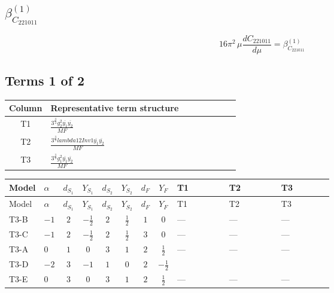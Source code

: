 \documentclass[8pt]{article}
\begin{document}
\begin{landscape}
\section*{$\beta_{C_{221011}}^{(1)}$}
\[16\pi^2\,\mu\frac{d C_{221011}}{d\mu}=\beta_{C_{221011}}^{(1)}\]
\subsection*{Terms 1 of 2}
\begin{center}
\begin{tabular}{@{}c >{\raggedright\arraybackslash}p{0.82\linewidth}@{}}
\toprule
Column & Representative term structure \\
\midrule
T1 & \(\displaystyle \frac{3^{\frac{3}{4}} g_{2}^{2} \overline{y_{1}} \overline{y_{2}}}{MF}\) \\
\midrule
T2 & \(\displaystyle \frac{3^{\frac{3}{4}} lambda12Inv1 \overline{y_{1}} \overline{y_{2}}}{MF}\) \\
\midrule
T3 & \(\displaystyle \frac{3^{\frac{3}{4}} g_{1}^{2} \overline{y_{1}} \overline{y_{2}}}{MF}\) \\
\midrule
\bottomrule
\end{tabular}
\end{center}
\smallskip
\tiny
\begin{longtable}{@{}llcccccc >{\raggedright\arraybackslash}p{0.21\linewidth} >{\raggedright\arraybackslash}p{0.21\linewidth} >{\raggedright\arraybackslash}p{0.21\linewidth}@{}}
\toprule
Model & $\alpha$ & $d_{S_1}$ & $Y_{S_1}$ & $d_{S_2}$ & $Y_{S_2}$ & $d_F$ & $Y_F$ & T1 & T2 & T3 \\
\midrule
\endfirsthead
\toprule
Model & $\alpha$ & $d_{S_1}$ & $Y_{S_1}$ & $d_{S_2}$ & $Y_{S_2}$ & $d_F$ & $Y_F$ & T1 & T2 & T3 \\
\midrule
\endhead
T3-B & $-1$ & $2$ & $-\frac{1}{2}$ & $2$ & $\frac{1}{2}$ & $1$ & $0$ & --- & --- & --- \\
\midrule
T3-C & $-1$ & $2$ & $-\frac{1}{2}$ & $2$ & $\frac{1}{2}$ & $3$ & $0$ & --- & --- & --- \\
\midrule
T3-A & $0$ & $1$ & $0$ & $3$ & $1$ & $2$ & $\frac{1}{2}$ & --- & --- & --- \\
\midrule
T3-D & $-2$ & $3$ & $-1$ & $1$ & $0$ & $2$ & $-\frac{1}{2}$ & \scriptsize\adjustbox{max width=\linewidth}{$\begin{gathered} - \frac{17 \cdot 3^{\frac{3}{4}} g_{2}^{2} \overline{y_{1}} \overline{y_{2}}}{24 MF}\end{gathered}$} & \scriptsize\adjustbox{max width=\linewidth}{$\begin{gathered} - \frac{3^{\frac{3}{4}} lambda12Inv1 \overline{y_{1}} \overline{y_{2}}}{6 MF}\end{gathered}$} & \scriptsize\adjustbox{max width=\linewidth}{$\begin{gathered} - \frac{3^{\frac{3}{4}} g_{1}^{2} \overline{y_{1}} \overline{y_{2}}}{8 MF}\end{gathered}$} \\
\midrule
T3-E & $0$ & $3$ & $0$ & $3$ & $1$ & $2$ & $\frac{1}{2}$ & --- & --- & --- \\
\midrule
\bottomrule
\end{longtable}
\clearpage

\end{landscape}
\end{document}
